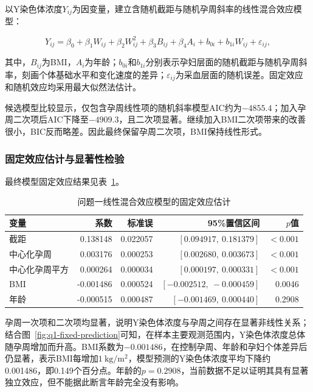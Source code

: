 以Y染色体浓度$Y_{ij}$为因变量，建立含随机截距与随机孕周斜率的线性混合效应模型：

\begin{equation}
  Y_{ij}=\beta_0+\beta_1W_{ij}+\beta_2W_{ij}^{2}
  +\beta_3B_{ij}+\beta_4A_i+b_{0i}+b_{1i}W_{ij}+\varepsilon_{ij},
  \label{eq:q1-lmm}
\end{equation}

其中，$B_{ij}$为BMI，$A_i$为年龄；$b_{0i}$和$b_{1i}$分别表示孕妇层面的随机截距与随机孕周斜率，刻画个体基础水平和变化速度的差异；$\varepsilon_{ij}$为采血层面的随机误差。固定效应和随机效应均采用最大似然法估计。

候选模型比较显示，仅包含孕周线性项的随机斜率模型AIC约为$-4855.4$；加入孕周二次项后AIC下降至$-4909.3$，且二次项显著。继续加入BMI二次项带来的改善很小，BIC反而略差。因此最终保留孕周二次项，BMI保持线性形式。

\subsubsection{固定效应估计与显著性检验}

最终模型固定效应结果见表~\ref{tab:q1-fixed-effects}。

\begin{table}[H]
  \centering
  \small
  \caption{问题一线性混合效应模型的固定效应估计}
  \label{tab:q1-fixed-effects}
  \begin{tabular}{lrrrr}
    \toprule
    变量 & 系数 & 标准误 & 95\%置信区间 & $p$值 \\
    \midrule
    截距 & 0.138148 & 0.022057 & $[0.094917,\ 0.181379]$ & $<0.001$ \\
    中心化孕周 & 0.003176 & 0.000253 & $[0.002680,\ 0.003673]$ & $<0.001$ \\
    中心化孕周平方 & 0.000264 & 0.000034 & $[0.000197,\ 0.000331]$ & $<0.001$ \\
    BMI & -0.001486 & 0.000524 & $[-0.002512,\ -0.000459]$ & 0.0046 \\
    年龄 & -0.000515 & 0.000487 & $[-0.001469,\ 0.000440]$ & 0.2908 \\
    \bottomrule
  \end{tabular}
\end{table}

孕周一次项和二次项均显著，说明Y染色体浓度与孕周之间存在显著非线性关系；结合图~\ref{fig:q1-fixed-prediction}可知，在样本主要观测范围内，Y染色体浓度总体随孕周增加而升高。BMI系数为$-0.001486$，在控制孕周、年龄和孕妇个体差异后仍显著，表示BMI每增加$1\ \mathrm{kg/m^2}$，模型预测的Y染色体浓度平均下降约0.001486，即0.149个百分点。年龄的$p=0.2908$，当前数据不足以证明其具有显著独立效应，但不能据此断言年龄完全没有影响。

